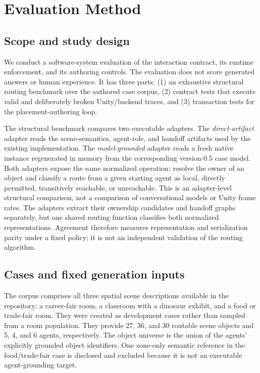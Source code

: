\section{Evaluation Method}

\subsection{Scope and study design}

We conduct a software-system evaluation of the interaction contract, its
runtime enforcement, and its authoring controls. The evaluation does not score
generated answers or human experience. It has three parts: (1) an exhaustive
structural routing benchmark over the authored case corpus, (2) contract tests
that execute valid and deliberately broken Unity/backend traces, and (3)
transaction tests for the placement-authoring loop.

The structural benchmark compares two executable adapters. The
\emph{direct-artifact} adapter reads the scene-semantics, agent-role, and
handoff artifacts used by the existing implementation. The
\emph{model-grounded} adapter reads a fresh native \systemname{} instance
regenerated in memory from the corresponding version-0.5 case model. Both
adapters expose the same normalized operation: resolve the owner of an object
and classify a route from a given starting agent as local, directly permitted,
transitively reachable, or unreachable. This is an adapter-level structural
comparison, not a comparison of conversational models or Unity frame rates.
The adapters extract their ownership candidates and handoff graphs separately,
but one shared routing function classifies both normalized representations.
Agreement therefore measures representation and serialization parity under a
fixed policy; it is not an independent validation of the routing algorithm.

\subsection{Cases and fixed generation inputs}

The corpus comprises all three spatial scene descriptions available in the
repository: a career-fair room, a classroom with a dinosaur exhibit, and a
food or trade-fair room. They were created as development cases rather than
sampled from a room population. They provide 27, 36, and 30 routable scene
objects and 5, 4, and 6 agents, respectively. The object universe is the union
of the agents' explicitly grounded object identifiers. One zone-only semantic
reference in the food/trade-fair case is disclosed and excluded because it is
not an executable agent-grounding target.

